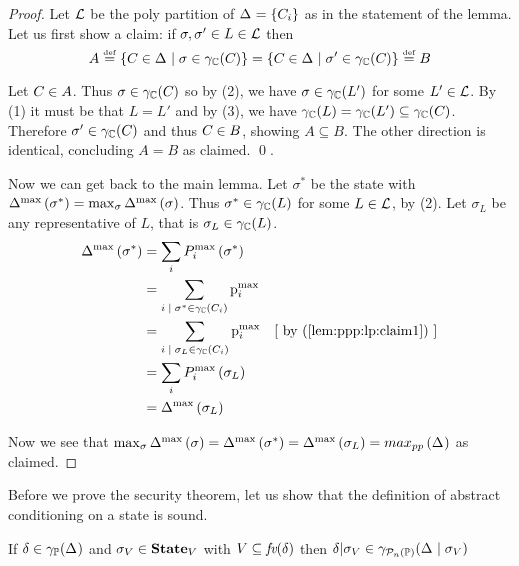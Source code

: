 \begin{proof} Let $ \mathcal{L} $ be the poly partition of $ \Delta_{}
= \left\{ C_{i} \right\} $ as in the statement of the lemma. Let us first
show a claim: if $ \sigma, \sigma' \in L \in \mathcal{L} $ then
\begin{equation} \label{lem:ppp:lp:claim1}
A \defeq \set{\getpoly{} \in \pps{} \given \sigma \in \pconc{\getpoly{}}}
= \set{\getpoly{} \in \pps{} \given \sigma' \in \pconc{\getpoly{}}} \defeq B
\end{equation}

Let $ C_{} \in A $. Thus $ \sigma \in \gamma_{\mathbb{C}}(C_{}) $ so
by  (2), we have $ \sigma \in \gamma_{\mathbb{C}}(L') $ for some
$ L' \in \mathcal{L} $. By (1) it must be that $ L = L' $ and by (3), we have
$\gamma_{\mathbb{C}}(L) = \gamma_{\mathbb{C}}(L') \subseteq \gamma_{\mathbb{C}}(C_{}) $. Therefore
$ \sigma' \in \gamma_{\mathbb{C}}(C_{}) $ and thus $ C_{} \in B $,
showing $ A \subseteq B $. The other direction is identical,
concluding $ A = B $ as claimed. \qed{}.

Now we can get back to the main lemma. Let $ \sigma^* $ be the state
with $ \Delta_{}^{\text{max}}\left( \sigma^* \right)
= \max_{\sigma} \Delta_{}^{\text{max}}\left( \sigma \right) $. Thus
$ \sigma^* \in \gamma_{\mathbb{C}}(L) $ for some $ L \in \mathcal{L} $, by 
(2). Let $ \sigma_L $ be any representative of $ L $, that is
$ \sigma_L \in \gamma_{\mathbb{C}}(L) $.
\vspace{15mm} %
\begin{align*}
\ppsprob{\pps{}}{\sigma^*} & = \sum_{i} \ppprob{\pp{i}}{\sigma^*} \\
                 &
                 = \sum_{i \given \sigma^* \in \pconc{\getpoly{i}}} \pmax{i} \\
                 &
                 = \sum_{i \given \sigma_L \in \pconc{\getpoly{i}}} \pmax{i}
                 & \mathstep{by \cnumref{lem:ppp:lp:claim1}} \\
                 & = \sum_{i} \ppprob{\pp{i}}{\sigma_L} \\
                 & = \ppsprob{\pps{}}{\sigma_L}
\end{align*}

Now we see that  $ \max_{\sigma}\Delta_{}^{\text{max}}\left( \sigma \right)
= \Delta_{}^{\text{max}}\left( \sigma^* \right) = \Delta_{}^{\text{max}}\left( \sigma_L \right) = max_{pp}\left( \Delta_{} \right) $ as claimed.
\end{proof}

Before we prove the security theorem, let us show that the definition
of abstract conditioning on a state is sound.

\begin{lemma} \label{lem:ppp:scond}
If $ \delta \in \gamma_{\mathbb{P}}(\Delta_{}) $ and $ \sigma_V \in \textbf{State}_{V} $
with $ V \subseteq \textit{fv}(\delta) $ then
$ \delta | \sigma_V \in \gamma_{\mathcal{P}_{n}\left( \mathbb{P} \right)}(\Delta_{} \mid \sigma_V) $
\end{lemma}

